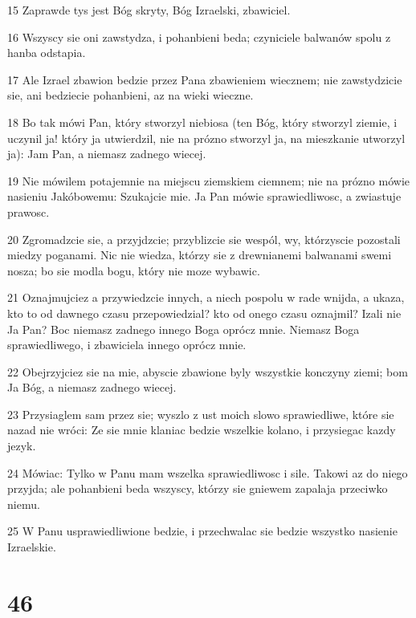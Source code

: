 \par 15 Zaprawde tys jest Bóg skryty, Bóg Izraelski, zbawiciel.
\par 16 Wszyscy sie oni zawstydza, i pohanbieni beda; czyniciele balwanów spolu z hanba odstapia.
\par 17 Ale Izrael zbawion bedzie przez Pana zbawieniem wiecznem; nie zawstydzicie sie, ani bedziecie pohanbieni, az na wieki wieczne.
\par 18 Bo tak mówi Pan, który stworzyl niebiosa (ten Bóg, który stworzyl ziemie, i uczynil ja! który ja utwierdzil, nie na prózno stworzyl ja, na mieszkanie utworzyl ja): Jam Pan, a niemasz zadnego wiecej.
\par 19 Nie mówilem potajemnie na miejscu ziemskiem ciemnem; nie na prózno mówie nasieniu Jakóbowemu: Szukajcie mie. Ja Pan mówie sprawiedliwosc, a zwiastuje prawosc.
\par 20 Zgromadzcie sie, a przyjdzcie; przyblizcie sie wespól, wy, którzyscie pozostali miedzy poganami. Nic nie wiedza, którzy sie z drewnianemi balwanami swemi nosza; bo sie modla bogu, który nie moze wybawic.
\par 21 Oznajmujciez a przywiedzcie innych, a niech pospolu w rade wnijda, a ukaza, kto to od dawnego czasu przepowiedzial? kto od onego czasu oznajmil? Izali nie Ja Pan? Boc niemasz zadnego innego Boga oprócz mnie. Niemasz Boga sprawiedliwego, i zbawiciela innego oprócz mnie.
\par 22 Obejrzyjciez sie na mie, abyscie zbawione byly wszystkie konczyny ziemi; bom Ja Bóg, a niemasz zadnego wiecej.
\par 23 Przysiaglem sam przez sie; wyszlo z ust moich slowo sprawiedliwe, które sie nazad nie wróci: Ze sie mnie klaniac bedzie wszelkie kolano, i przysiegac kazdy jezyk.
\par 24 Mówiac: Tylko w Panu mam wszelka sprawiedliwosc i sile. Takowi az do niego przyjda; ale pohanbieni beda wszyscy, którzy sie gniewem zapalaja przeciwko niemu.
\par 25 W Panu usprawiedliwione bedzie, i przechwalac sie bedzie wszystko nasienie Izraelskie.

\chapter{46}

